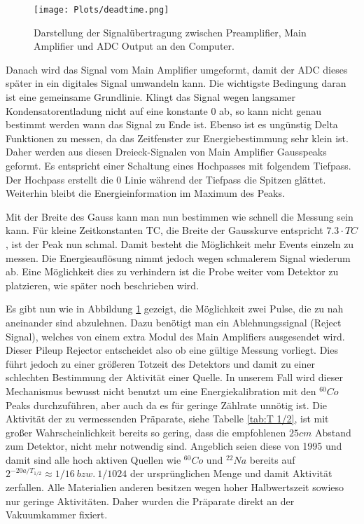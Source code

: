 \documentclass[]{article}
\begin{document}
	\begin{figure}[H]
		\centering 
		\texttt{[image: Plots/deadtime.png]}
		\caption{Darstellung der Signalübertragung zwischen Preamplifier, Main Amplifier und ADC Output an den Computer. \cite{signalverarbeitung}  
		\label{fig:signals}}
	\end{figure}
	
	Danach wird das Signal vom Main Amplifier umgeformt, damit der ADC dieses später in ein digitales Signal umwandeln kann. Die wichtigste Bedingung daran ist eine gemeinsame Grundlinie. Klingt das Signal wegen langsamer Kondensatorentladung nicht auf eine konstante 0 ab, so kann nicht genau bestimmt werden wann das Signal zu Ende ist. Ebenso ist es ungünstig Delta Funktionen zu messen, da das Zeitfenster zur Energiebestimmung sehr klein ist. Daher werden aus diesen Dreieck-Signalen von Main Amplifier Gausspeaks geformt. Es entspricht einer Schaltung eines Hochpasses mit folgendem Tiefpass. Der Hochpass erstellt die 0 Linie während der Tiefpass die Spitzen glättet. Weiterhin bleibt die Energieinformation im Maximum des Peaks.
	
	Mit der Breite des Gauss kann man nun bestimmen wie schnell die Messung sein kann. Für kleine Zeitkonstanten TC, die Breite der Gausskurve entspricht $7.3\cdot TC$ \cite{signalverarbeitung}, ist der Peak nun schmal. Damit besteht die Möglichkeit mehr Events einzeln zu messen. Die Energieauflösung nimmt jedoch wegen schmalerem Signal wiederum ab. Eine Möglichkeit dies zu verhindern ist die Probe weiter vom Detektor zu platzieren, wie später noch beschrieben wird.
	
	Es gibt nun wie in Abbildung \ref{fig:signals} gezeigt, die Möglichkeit zwei Pulse, die zu nah aneinander sind abzulehnen. Dazu benötigt man ein Ablehnungssignal (Reject Signal), welches von einem extra Modul des Main Amplifiers ausgesendet wird. Dieser Pileup Rejector entscheidet also ob eine gültige Messung vorliegt. Dies führt jedoch zu einer größeren Totzeit des Detektors und damit zu einer schlechten Bestimmung der Aktivität einer Quelle. In unserem Fall wird dieser Mechanismus bewusst nicht benutzt um eine Energiekalibration mit den $^{60}Co$ Peaks durchzuführen, aber auch da es für geringe Zählrate unnötig ist.  
	Die Aktivität der zu vermessenden Präparate, siehe Tabelle \ref{tab:T 1/2}, ist mit großer Wahrscheinlichkeit bereits so gering, dass die empfohlenen $25cm$ Abstand zum Detektor, nicht mehr notwendig sind. Angeblich seien diese von 1995 und damit sind alle hoch aktiven Quellen wie $^{60}Co$ und $^{22}Na$ bereits auf $2^{-20a/T_{1/2}} \approx 1/16 \ bzw. \ 1/1024 $ der ursprünglichen Menge und damit Aktivität zerfallen. Alle Materialien anderen besitzen wegen hoher Halbwertszeit sowieso nur geringe Aktivitäten. 
	Daher wurden die Präparate direkt an der Vakuumkammer fixiert.
	
\end{document}
